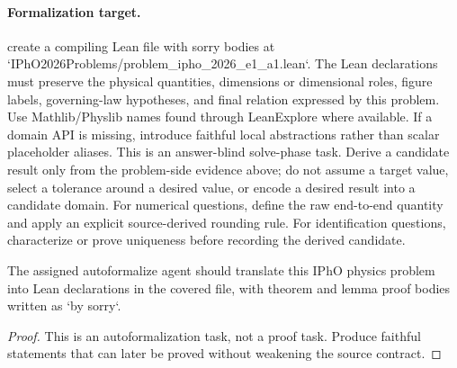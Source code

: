 \paragraph{Formalization target.}
create a compiling Lean file with sorry bodies at `IPhO2026Problems/problem\_ipho\_2026\_e1\_a1.lean`.
The Lean declarations must preserve the physical quantities, dimensions or dimensional roles, figure labels, governing-law hypotheses, and final relation expressed by this problem.
Use Mathlib/Physlib names found through LeanExplore where available. If a domain API is missing, introduce faithful local abstractions rather than scalar placeholder aliases.
This is an answer-blind solve-phase task. Derive a candidate result only from the problem-side evidence above; do not assume a target value, select a tolerance around a desired value, or encode a desired result into a candidate domain.
For numerical questions, define the raw end-to-end quantity and apply an explicit source-derived rounding rule. For identification questions, characterize or prove uniqueness before recording the derived candidate.

\begin{theorem}
\label{thm:physics:ipho_2026_e1_a1:target}
The assigned autoformalize agent should translate this IPhO physics problem into Lean declarations in the covered file, with theorem and lemma proof bodies written as `by sorry`.
\end{theorem}
\begin{proof}
This is an autoformalization task, not a proof task. Produce faithful statements that can later be proved without weakening the source contract.
\end{proof}
